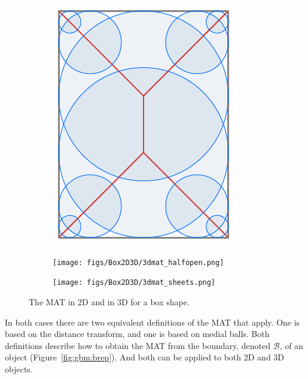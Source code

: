 \begin{figure}
	\centering
	\begin{subfigure}{0.26\linewidth}
		\includegraphics[width=\linewidth]{figs/Box2D3D/3dmat_2d.pdf}
		\label{fig:3dmat_2d}
	\end{subfigure}
	\quad
	\begin{subfigure}{0.33\linewidth}
		\texttt{[image: figs/Box2D3D/3dmat\_halfopen.png]}
		\label{fig:3dmat_halfopen}
	\end{subfigure}
	\quad
	\begin{subfigure}{0.33\linewidth}
		\texttt{[image: figs/Box2D3D/3dmat\_sheets.png]}
		\label{fig:3dmat_sheets}
	\end{subfigure}
	\caption{The MAT in 2D and in 3D for a box shape.}%
	\label{fig:3dmat}
\end{figure}
In both cases there are two equivalent definitions of the MAT that apply. 
One is based on the distance transform, and one is based on medial balls. 
Both definitions describe how to obtain the MAT from the boundary, denoted $
\mathcal{B}$, of an object (Figure~\ref{fig:gbm:brep}).
And both can be applied to both 2D and 3D objects.

